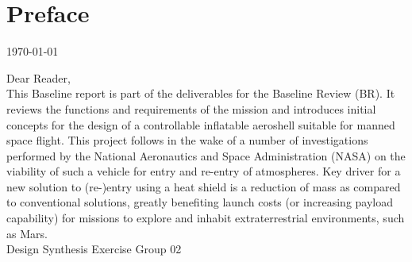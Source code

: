 \section*{Preface}\label{cha:preface}

\begin{flushright}
	\today
\end{flushright}

Dear Reader,	
\\ [1cm]
This Baseline report is part of the deliverables for the Baseline Review (BR). It reviews the functions and requirements of the mission and introduces initial concepts for the design of a controllable inflatable aeroshell suitable for manned space flight. This project follows in the wake of a number of investigations performed by the National Aeronautics and Space Administration (NASA) on the viability of such a vehicle for entry and re-entry of atmospheres. Key driver for a new solution to (re-)entry using a heat shield is a reduction of mass as compared to conventional solutions, greatly benefiting launch costs (or increasing payload capability) for missions to explore and inhabit extraterrestrial environments, such as Mars. 
\\ [1.5cm]
Design Synthesis Exercise Group 02